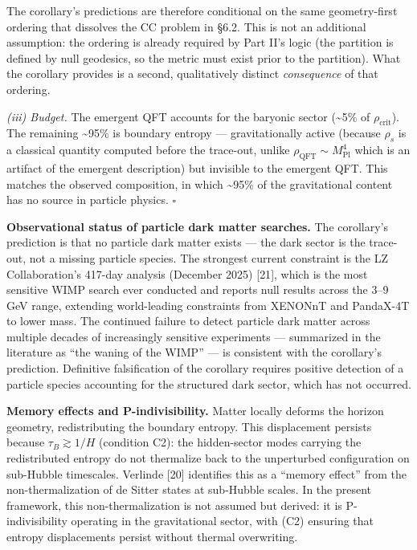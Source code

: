 \documentclass[
]{article}
\begin{document}
The corollary's predictions are therefore conditional on the same
geometry-first ordering that dissolves the CC problem in §6.2. This is
not an additional assumption: the ordering is already required by Part
II's logic (the partition is defined by null geodesics, so the metric
must exist prior to the partition). What the corollary provides is a
second, qualitatively distinct \emph{consequence} of that ordering.

\emph{(iii) Budget.} The emergent QFT accounts for the baryonic sector
(\textasciitilde5\% of \(\rho_{\text{crit}}\)). The remaining
\textasciitilde95\% is boundary entropy --- gravitationally active
(because \(\rho_s\) is a classical quantity computed before the
trace-out, unlike \(\rho_{\text{QFT}} \sim M_{\text{Pl}}^4\) which is an
artifact of the emergent description) but invisible to the emergent QFT.
This matches the observed composition, in which \textasciitilde95\% of
the gravitational content has no source in particle physics. \(\square\)

\textbf{Observational status of particle dark matter searches.} The
corollary's prediction is that no particle dark matter exists --- the
dark sector is the trace-out, not a missing particle species. The
strongest current constraint is the LZ Collaboration's 417-day analysis
(December 2025) {[}21{]}, which is the most sensitive WIMP search ever
conducted and reports null results across the 3--9 GeV range, extending
world-leading constraints from XENONnT and PandaX-4T to lower mass. The
continued failure to detect particle dark matter across multiple decades
of increasingly sensitive experiments --- summarized in the literature
as ``the waning of the WIMP'' --- is consistent with the corollary's
prediction. Definitive falsification of the corollary requires positive
detection of a particle species accounting for the structured dark
sector, which has not occurred.

\textbf{Memory effects and P-indivisibility.} Matter locally deforms the
horizon geometry, redistributing the boundary entropy. This displacement
persists because \(\tau_B \gtrsim 1/H\) (condition C2): the
hidden-sector modes carrying the redistributed entropy do not thermalize
back to the unperturbed configuration on sub-Hubble timescales. Verlinde
{[}20{]} identifies this as a ``memory effect'' from the
non-thermalization of de Sitter states at sub-Hubble scales. In the
present framework, this non-thermalization is not assumed but derived:
it is P-indivisibility operating in the gravitational sector, with (C2)
ensuring that entropy displacements persist without thermal overwriting.
\end{document}
